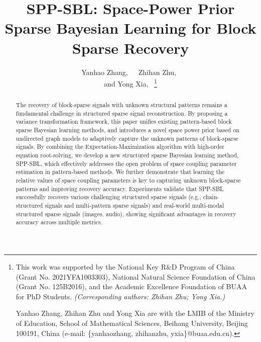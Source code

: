 \documentclass[lettersize,journal]{IEEEtran}
\theoremstyle{remark}
\begin{document}
\title{SPP-SBL: Space-Power Prior Sparse Bayesian Learning for Block Sparse Recovery}

\author{Yanhao Zhang,~~~Zhihan Zhu,~ \\
	and Yong Xia,~
\thanks{This work was supported by the National Key R\&D Program of China (Grant No. 2021YFA1003303), National Natural Science Foundation of China (Grant No. 125B2016), and the Academic Excellence Foundation of BUAA for PhD Students. \textit{(Corresponding authors: Zhihan Zhu; Yong Xia.)}
	
	Yanhao Zhang, Zhihan Zhu and Yong Xia are with the LMIB of the Ministry of Education, School of Mathematical Sciences, Beihang University, Beijing 100191, China (e-mail: \{yanhaozhang, zhihanzhu, yxia\}@buaa.edu.cn).}%

}



\maketitle

\begin{abstract}
The recovery of block-sparse signals with unknown structural patterns remains a fundamental challenge in structured sparse signal reconstruction. By proposing a variance transformation framework, this paper unifies existing pattern-based block sparse Bayesian learning methods, and introduces a novel space power prior based on undirected graph models to adaptively capture the unknown patterns of block-sparse signals. By combining the {Expectation-Maximization} algorithm with high-order equation root-solving, we develop a new structured sparse Bayesian learning method, SPP-SBL, which effectively addresses the open problem of space coupling parameter estimation in pattern-based methods. We further demonstrate that learning the relative values of space coupling parameters is key to capturing unknown block-sparse patterns and improving recovery accuracy. Experiments validate that SPP-SBL successfully recovers various challenging structured sparse signals (e.g., chain-structured signals and multi-pattern sparse signals) and real-world multi-modal structured sparse signals (images, audio), showing significant advantages in recovery accuracy across multiple metrics.
\end{abstract}
\end{document}
